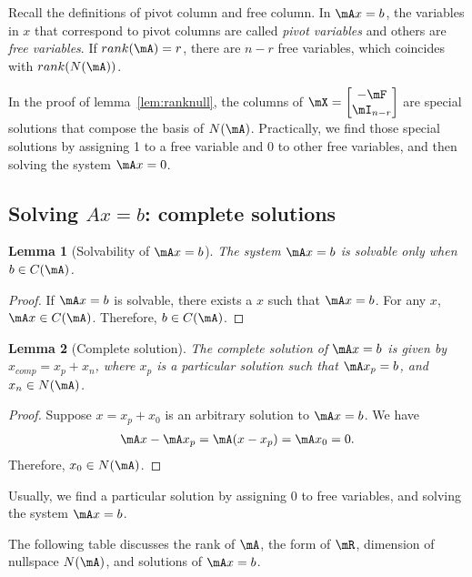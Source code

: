 \documentclass[11pt]{article}
\theoremstyle{plain}
\newtheorem{lem}{Lemma}
\theoremstyle{definition}
\begin{document}
Recall the definitions of pivot column and free column. In $\mA x = b$, the variables in $x$ that correspond to pivot columns are called \textit{pivot variables} and others are \textit{free variables}. If $rank(\mA) = r$, there are $n-r$ free variables, which coincides with $rank(N(\mA))$. 

In the proof of lemma~\ref{lem:ranknull}, the columns of $\mX = \begin{bmatrix} -\mF \\ \mI_{n-r}	\end{bmatrix}$ are special solutions that compose the basis of $N(\mA)$. Practically, we find those special solutions by assigning 1 to a free variable and 0 to other free variables, and then solving the system $\mA x = 0$. 



\subsection{Solving $Ax = b$: complete solutions}

\begin{lem}[Solvability of $\mA x = b$]\label{lem:solve} The system $\mA x = b$ is solvable only when $b \in C(\mA)$.	
\end{lem}

\begin{proof}
	 If $\mA x = b$ is solvable, there exists a $x$ such that $\mA x = b$. For any $x$, $\mA x \in C(\mA)$. Therefore, $b \in C(\mA)$.
\end{proof}

\begin{lem}[Complete solution]\label{lem:compsolu} The complete solution of $\mA x = b$ is given by $x_{comp} = x_p + x_n$, where $x_p$ is a particular solution such that $\mA x_p = b$, and $x_n \in N(\mA)$. 
\end{lem}

\begin{proof}
	Suppose $x = x_p + x_0$ is an arbitrary solution to $\mA x= b$. We have 
	\begin{align}
		\mA x - \mA x_p = \mA (x- x_p) = \mA x_0 = 0.
	\end{align}
	Therefore, $x_0 \in N(\mA)$.
\end{proof}

Usually, we find a particular solution by assigning 0 to free variables, and solving the system $\mA x = b$. 

\vspace{.2cm}
The following table discusses the rank of $\mA$, the form of $\mR$, dimension of nullspace $N(\mA)$, and solutions of $\mA x = b$.
\end{document}
